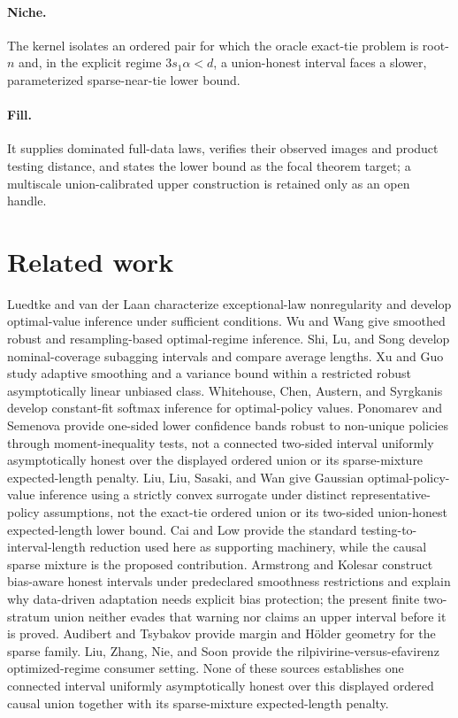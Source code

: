 \documentclass{article}
\begin{document}
\paragraph{Niche.} The kernel isolates an ordered pair for which the oracle exact-tie problem is root-\(n\) and, in the explicit regime \(3s_1\alpha<d\), a union-honest interval faces a slower, parameterized sparse-near-tie lower bound.

\paragraph{Fill.} It supplies dominated full-data laws, verifies their observed images and product testing distance, and states the lower bound as the focal theorem target; a multiscale union-calibrated upper construction is retained only as an open handle.

\section{Related work}

Luedtke and van der Laan \cite{LuedtkeVanderLaan2016} characterize exceptional-law nonregularity and develop optimal-value inference under sufficient conditions. Wu and Wang \cite{WuWang2021} give smoothed robust and resampling-based optimal-regime inference. Shi, Lu, and Song \cite{ShiLuSong2020} develop nominal-coverage subagging intervals and compare average lengths. Xu and Guo \cite{XuGuo2026} study adaptive smoothing and a variance bound within a restricted robust asymptotically linear unbiased class. Whitehouse, Chen, Austern, and Syrgkanis \cite{WhitehouseAusternSyrgkanis2025} develop constant-fit softmax inference for optimal-policy values. Ponomarev and Semenova \cite{PonomarevSemenova2024} provide one-sided lower confidence bands robust to non-unique policies through moment-inequality tests, not a connected two-sided interval uniformly asymptotically honest over the displayed ordered union or its sparse-mixture expected-length penalty. Liu, Liu, Sasaki, and Wan \cite{LiuLiuSasakiWan2025} give Gaussian optimal-policy-value inference using a strictly convex surrogate under distinct representative-policy assumptions, not the exact-tie ordered union or its two-sided union-honest expected-length lower bound. Cai and Low \cite{CaiLow2004} provide the standard testing-to-interval-length reduction used here as supporting machinery, while the causal sparse mixture is the proposed contribution. Armstrong and Kolesar \cite{ArmstrongKolesar2020} construct bias-aware honest intervals under predeclared smoothness restrictions and explain why data-driven adaptation needs explicit bias protection; the present finite two-stratum union neither evades that warning nor claims an upper interval before it is proved. Audibert and Tsybakov \cite{AudibertTsybakov2007} provide margin and Hölder geometry for the sparse family. Liu, Zhang, Nie, and Soon \cite{LiuZhangNieSoon2017} provide the rilpivirine-versus-efavirenz optimized-regime consumer setting. None of these sources establishes one connected interval uniformly asymptotically honest over this displayed ordered causal union together with its sparse-mixture expected-length penalty.
\end{document}
